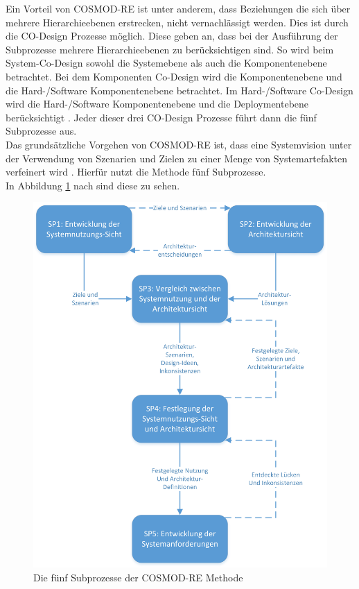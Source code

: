 Ein Vorteil von COSMOD-RE ist unter anderem, dass Beziehungen die sich \"uber mehrere Hierarchieebenen erstrecken, nicht vernachl\"assigt werden. Dies ist durch die CO-Design Prozesse m\"oglich. Diese geben an, dass bei der Ausf\"uhrung der Subprozesse mehrere Hierarchieebenen zu ber\"ucksichtigen sind. So wird beim System-Co-Design sowohl die Systemebene als auch die Komponentenebene betrachtet. Bei dem Komponenten Co-Design wird die Komponentenebene und die Hard-/Software Komponentenebene betrachtet. Im Hard-/Software Co-Design wird die Hard-/Software Komponentenebene und die Deploymentebene ber\"ucksichtigt \cite{Poh02}. Jeder dieser drei CO-Design Prozesse f\"uhrt dann die f\"unf Subprozesse aus.\\ 

Das grunds\"atzliche Vorgehen von COSMOD-RE ist, dass eine Systemvision unter der Verwendung von Szenarien und Zielen zu einer Menge von Systemartefakten verfeinert wird \cite{Poh01}. Hierf\"ur nutzt die Methode f\"unf Subprozesse. \\

In Abbildung \ref{pro5} nach \cite{Poh01} sind diese zu sehen. \\

\begin{figure}[h]
	\centering
	\includegraphics[scale=0.65]{COSMODRE5prozesse.jpg} 
	\caption{Die f\"unf Subprozesse der COSMOD-RE Methode}\label{pro5}
\end{figure}

